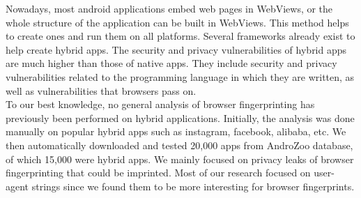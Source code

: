 Nowadays, most android applications embed web pages in WebViews, or the whole structure of the application can be built in WebViews. This method helps to create ones and run them on all platforms. Several frameworks already exist to help create hybrid apps. The security and privacy vulnerabilities of hybrid apps are much higher than those of native apps. They include security and privacy vulnerabilities related to the programming language in which they are written, as well as vulnerabilities that browsers pass on.  \\
 To our best knowledge, no general analysis of browser fingerprinting has previously been performed on hybrid applications. Initially, the analysis was done manually on popular hybrid apps such as instagram, facebook, alibaba, etc. We then automatically downloaded and tested 20,000 apps from AndroZoo database, of which 15,000 were hybrid apps. We mainly focused on privacy leaks of browser fingerprinting that could be imprinted. Most of our research focused on user-agent strings since we found them to be more interesting for browser fingerprints.

